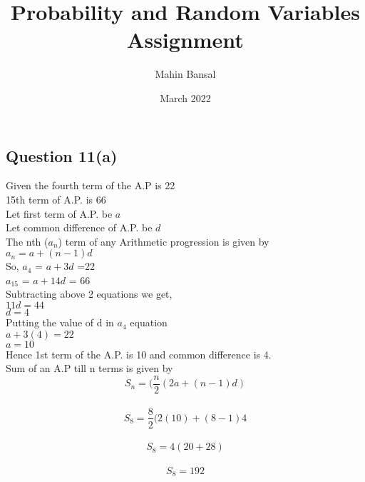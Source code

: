 \documentclass{article}
\title{Probability and Random Variables Assignment}
\author{Mahin Bansal }
\date{March 2022}
\begin{document}
\begin{multicols}{2}


\maketitle

\section{Question 11(a)}
Given the fourth term of the A.P is 22\\
15th term of A.P. is 66\\
Let first term of A.P. be $a$\\
Let common difference of A.P. be $d$\\
The nth ($a_n$) term  of any Arithmetic progression is given by 
\\$a_n = a +(n-1)d$\\
So,
$a_4$ = $a+3d$ =22\\
$a_15$ = $a+14d$ = 66\\
Subtracting above 2 equations we get,\\
$11d = 44$\\
$d=4$\\
Putting the value of d in $a_4$ equation \\
$a + 3(4) = 22$\\
$a = 10$\\
Hence  1st term of the A.P. is 10 and common difference is 4.\\
Sum of an A.P till n terms is given by $$S_n = (\frac{n}{2}(2a+(n-1)d)$$\\
$$S_8 =\frac{8}{2}(2(10)+(8-1)4$$\\
$$S_8 = 4(20+28)$$\\
$$ S_8 = 192$$\\
\end{multicols}
\end{document}
